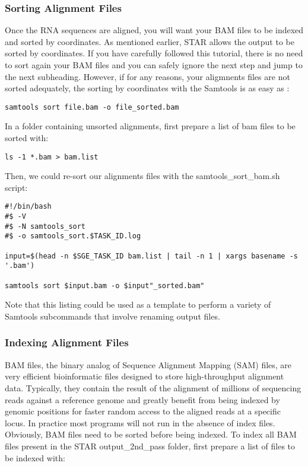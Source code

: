 \subsubsection{Sorting Alignment Files}


Once the RNA sequences are aligned, you will want your BAM files to be indexed and sorted by coordinates. As mentioned earlier, STAR allows the output to be sorted by coordinates. If you have carefully followed this tutorial, there is no need to sort again your BAM files and you can safely ignore the next step and jump to the next subheading. However, if for any reasons, your aligmnents files are not sorted adequately, the sorting by coordinates with the Samtools is as easy as :

\begin{verbatim}
samtools sort file.bam -o file_sorted.bam
\end{verbatim}

In a folder containing unsorted alignments, first prepare a list of bam files to be sorted with:

\begin{verbatim}
ls -1 *.bam > bam.list
\end{verbatim}

Then, we could re-sort our alignments files with the \noindent samtools\_sort\_bam.sh script:

\begin{verbatim}
#!/bin/bash
#$ -V
#$ -N samtools_sort
#$ -o samtools_sort.$TASK_ID.log

input=$(head -n $SGE_TASK_ID bam.list | tail -n 1 | xargs basename -s '.bam')

samtools sort $input.bam -o $input"_sorted.bam"

\end{verbatim}

Note that this listing could be used as a template to perform a variety of Samtools subcommands that involve renaming output files.

\subsubsection{Indexing Alignment Files}

BAM files, the binary analog of Sequence Alignment Mapping (SAM) files,  are very efficient bioinformatic files designed to store high-throughput alignment data. Typically, they contain the result of the alignment of millions of sequencing reads against a reference genome and greatly benefit from being indexed by genomic positions for faster random access to the aligned reads at a specific locus. In practice most programs will not run in the absence of index files. Obviously, BAM files need to be sorted before being indexed. To index all BAM files present in the STAR output\_2nd\_pass folder, first prepare a list of files to be indexed with:


